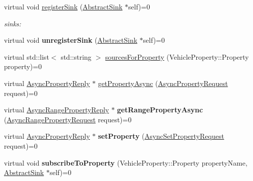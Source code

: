 \begin{DoxyCompactItemize}
\item 
\hypertarget{classAbstractRoutingEngine_a179052d9ab3f70ddb4c91421f94c45a9}{virtual void \hyperlink{classAbstractRoutingEngine_a179052d9ab3f70ddb4c91421f94c45a9}{register\-Sink} (\hyperlink{classAbstractSink}{Abstract\-Sink} $\ast$self)=0}\label{classAbstractRoutingEngine_a179052d9ab3f70ddb4c91421f94c45a9}

\begin{DoxyCompactList}\small\item\em sinks\-: \end{DoxyCompactList}\item 
\hypertarget{classAbstractRoutingEngine_a0f0a96c938c395565d01e0f78cc3bea8}{virtual void {\bfseries unregister\-Sink} (\hyperlink{classAbstractSink}{Abstract\-Sink} $\ast$self)=0}\label{classAbstractRoutingEngine_a0f0a96c938c395565d01e0f78cc3bea8}

\item 
virtual std\-::list$<$ std\-::string $>$ \hyperlink{classAbstractRoutingEngine_a9eb81869eaa35dc53f1c0eb6d53f7968}{sources\-For\-Property} (Vehicle\-Property\-::\-Property property)=0
\item 
virtual \hyperlink{classAsyncPropertyReply}{Async\-Property\-Reply} $\ast$ \hyperlink{classAbstractRoutingEngine_ad1cbda415f674be4a3ce49be05aa8ee8}{get\-Property\-Async} (\hyperlink{classAsyncPropertyRequest}{Async\-Property\-Request} request)=0
\item 
\hypertarget{classAbstractRoutingEngine_a335eaf3aea69c5b55b28819119156dd6}{virtual \hyperlink{classAsyncRangePropertyReply}{Async\-Range\-Property\-Reply} $\ast$ {\bfseries get\-Range\-Property\-Async} (\hyperlink{classAsyncRangePropertyRequest}{Async\-Range\-Property\-Request} request)=0}\label{classAbstractRoutingEngine_a335eaf3aea69c5b55b28819119156dd6}

\item 
\hypertarget{classAbstractRoutingEngine_a740b2c9bd8f842499cf250f660553651}{virtual \hyperlink{classAsyncPropertyReply}{Async\-Property\-Reply} $\ast$ {\bfseries set\-Property} (\hyperlink{classAsyncSetPropertyRequest}{Async\-Set\-Property\-Request} request)=0}\label{classAbstractRoutingEngine_a740b2c9bd8f842499cf250f660553651}

\item 
\hypertarget{classAbstractRoutingEngine_ac63cdb37d4747d1b9a3fd72177745729}{virtual void {\bfseries subscribe\-To\-Property} (Vehicle\-Property\-::\-Property property\-Name, \hyperlink{classAbstractSink}{Abstract\-Sink} $\ast$self)=0}\label{classAbstractRoutingEngine_ac63cdb37d4747d1b9a3fd72177745729}


\end{DoxyCompactItemize}
